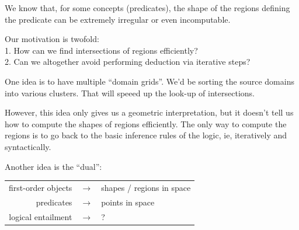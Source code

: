 We know that, for some concepts (predicates), the shape of the regions defining the predicate can be extremely irregular or even incomputable.

Our motivation is twofold:\\
1. How can we find intersections of regions efficiently?\\
2. Can we altogether avoid performing deduction via iterative steps?

One idea is to have multiple ``domain grids''.  We'd be sorting the source domains into various clusters.  That will speeed up the look-up of intersections.

However, this idea only gives us a geometric interpretation, but it doesn't tell us how to compute the shapes of regions efficiently.  The only way to compute the regions is to go back to the basic inference rules of the logic, ie, iteratively and syntactically.

Another idea is the ``dual'':\\
\tab \begin{tabular}{rll}
first-order objects & $\longrightarrow$ & shapes / regions in space\\
predicates          & $\longrightarrow$ & points in space\\
logical entailment  & $\longrightarrow$ & ?\\
\end{tabular}
